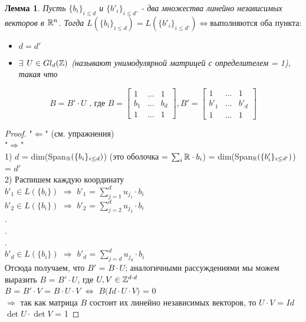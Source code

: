 \documentclass[11pt]{article}
\newtheorem{lemma}{Лемма} %
\begin{document}
\begin{lemma} \label{lem:Lemma1}
	Пусть $\{b_i\}_{i \leq d}$ и $\{b'_i\}_{i \leq d'}$ - два множества линейно независимых векторов в ${{\mathbb R}}^n$. Тогда
	$L(\{b_i\}_{i \leq d}) = L(\{b'_i\}_{i \leq d'}) \Leftrightarrow \mbox{выполняются оба пункта:}$\\
	\begin{itemize}
	\item $d = d'$\\
	\item $\exists$ $U \in Gl_d({{\mathbb Z}})$ (называют унимодулярной матрицей с определителем = 1), такая что 
	\end{itemize}
\[B = B' \cdot U \mbox{ , где }
	B =
	\begin{bmatrix}
	1 & ... & 1 \\
	b_1 & ... & b_d \\
	1 & ... & 1
	\end{bmatrix}, 
	B' =
	\begin{bmatrix}
	1 & ... & 1 \\
	b'_1 & ... & b'_d \\
	1 & ... & 1
	\end{bmatrix}
\]
\end{lemma}

\begin{proof}
	"$\Leftarrow$" (см. упражнения)\\
	"$\Rightarrow$"\\
	1)  $d$ = dim\Big(Span$_{{\mathbb R}}(\{b_i\}_{i \leq d})$\Big) (это оболочка = $\sum_i {{\mathbb R}} \cdot b_i$) = dim\Big(Span$_{{\mathbb R}}(\{b'_i\}_{i \leq d'})$\Big) = $d'$\\
	2) Распишем каждую координату\\
	$b'_1 \in L(\{b_i\})$ $\Rightarrow$ $b'_1$ = $\sum_{j = 1}^d u_{j_1} \cdot b_i$\\
	$b'_2 \in L(\{b_i\})$ $\Rightarrow$ $b'_2$ = $\sum_{j = 2}^d u_{j_2} \cdot b_i$\\
	.\\
	.\\
	.\\
	$b'_d \in L(\{b_i\})$ $\Rightarrow$ $b'_d$ = $\sum_{j = d}^d u_{j_d} \cdot b_i$\\
	Отсюда получаем, что $B'$ = $B \cdot U$; аналогичными рассуждениями мы можем выразить $B$ = $B' \cdot U$, где $U, V \in {{\mathbb Z}}^{d \cdot d}$\\
	$B$ = $B' \cdot V$ = $B \cdot U \cdot V$ $\Leftrightarrow$ $B \Big( Id \cdot U \cdot V \Big)$ = 0\\
	$\Rightarrow$ так как матрица $B$ состоит их линейно независимых векторов, то $U \cdot V$ = $Id$\\
	$\det{U} \cdot \det{V}$ = 1
\end{proof}
\end{document}
